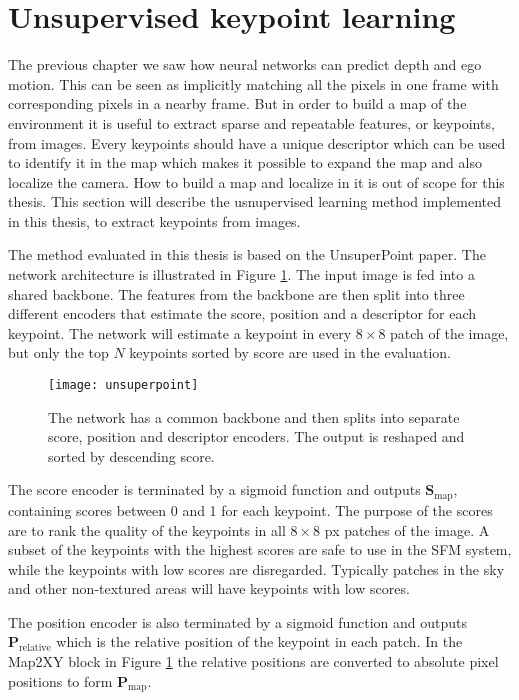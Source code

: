 \section{Unsupervised keypoint learning}

The previous chapter we saw how neural networks can predict depth and ego motion. This can be seen as implicitly matching all the pixels in one frame with corresponding pixels in a nearby frame. But in order to build a map of the environment it is useful to extract sparse and repeatable features, or keypoints, from images. Every keypoints should have a unique descriptor which can be used to identify it in the map which makes it possible to expand the map and also localize the camera. How to build a map and localize in it is out of scope for this thesis. This section will describe the usnupervised learning method implemented in this thesis, to extract keypoints from images.

The method evaluated in this thesis is based on the UnsuperPoint paper\cite{unsuperpoint}. The network architecture is illustrated in Figure \ref{fig:unsuperpoint}. The input image is fed into a shared backbone. The features from the backbone are then split into three different encoders that estimate the score, position and a descriptor for each keypoint. The network will estimate a keypoint in every $8\times 8$ patch of the image, but only the top $N$ keypoints sorted by score are used in the evaluation.

\begin{figure}[H]
	\centering
	\texttt{[image: unsuperpoint]}
	\caption{The network has a common backbone and then splits into separate score, position and descriptor encoders. The output is reshaped and sorted by descending score.}
	\label{fig:unsuperpoint}
\end{figure}

The score encoder is terminated by a sigmoid function and outputs $\textbf{S}_{\mathrm{map}}$, containing scores between 0 and 1 for each keypoint. The purpose of the scores are to rank the quality of the keypoints in all $8\times 8$ px patches of the image. A subset of the keypoints with the highest scores are safe to use in the SFM system, while the keypoints with low scores are disregarded. Typically patches in the sky and other non-textured areas will have keypoints with low scores.

The position encoder is also terminated by a sigmoid function and outputs $\textbf{P}_{\textrm{relative}}$ which is the relative position of the keypoint in each patch. In the Map2XY block in Figure \ref{fig:unsuperpoint} the relative positions are converted to absolute pixel positions to form $\textbf{P}_{\textrm{map}}$.

